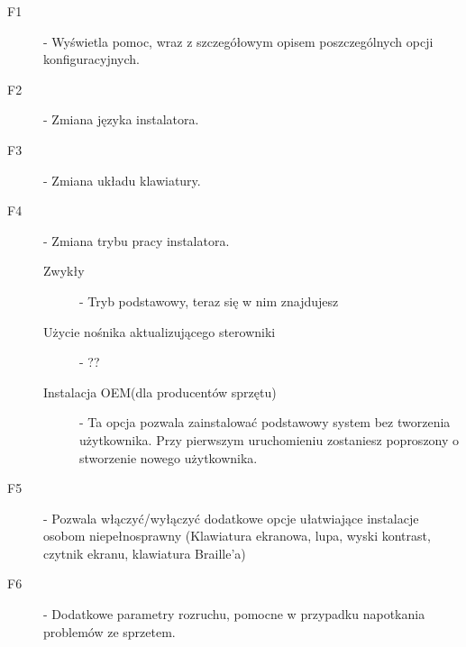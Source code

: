 \begin{description}
\item[F1] - Wyświetla pomoc, wraz z szczegółowym opisem poszczególnych opcji konfiguracyjnych.
\item[F2] - Zmiana języka instalatora.
\item[F3] - Zmiana układu klawiatury.
\item[F4] - Zmiana trybu pracy instalatora.
	\begin{description}
	\item[Zwykły] - Tryb podstawowy, teraz się w nim znajdujesz
	\item[Użycie nośnika aktualizującego sterowniki] - ??
	\item[Instalacja OEM(dla producentów sprzętu)] - Ta opcja pozwala zainstalować podstawowy system bez tworzenia użytkownika. Przy pierwszym uruchomieniu zostaniesz poproszony o stworzenie nowego użytkownika.
	\end{description}
\item[F5] - Pozwala włączyć/wyłączyć dodatkowe opcje ułatwiające instalacje osobom niepełnosprawny (Klawiatura ekranowa, lupa, wyski kontrast, czytnik ekranu, klawiatura Braille'a)
\item[F6] - Dodatkowe parametry rozruchu, pomocne w przypadku napotkania problemów ze sprzetem.
\end{description}
\clearpage

